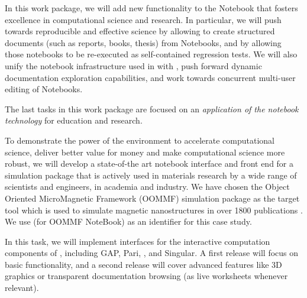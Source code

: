 \begin{workpackage}
\begin{wpdescription}

    In this work package, we will add new functionality to the \Jupyter
    Notebook that fosters excellence in computational science and
    research. In particular, we will push towards reproducible and
    effective science by allowing to create structured
    documents (such as reports, books, thesis) from Notebooks, and by
    allowing those notebooks to be re-executed as self-contained
    regression tests. We will also unify the notebook infrastructure
    used in \Sage with \Jupyter, push forward dynamic documentation
    exploration capabilities, and work towards concurrent multi-user
    editing of Notebooks.

  The last tasks in this work package are focused on an
  \emph{application of the \Jupyter notebook technology} for education
  and research.


  To demonstrate the power of the \Jupyter {} environment to
  accelerate computational science, deliver better value for money and
  make computational science more robust, we will develop a
  state-of-the art \Jupyter notebook interface and front end for a
  simulation package that is actively used in materials research by a
  wide range of scientists and engineers, in academia and industry. We
  have chosen the Object Oriented MicroMagnetic Framework (OOMMF)
  simulation package \cite{OOMMF-url} as the target tool which is used
  to simulate magnetic nanostructures in over 1800 publications
  \cite{OOMMF-citations-url}. We use \OOMMFNB{} (for OOMMF NoteBook)
  as an identifier for this case study.
\end{wpdescription}

\begin{tasklist}
\begin{task}[title=Uniform notebook interface for all interactive components,id=ipython-kernels]
  In this task, we will implement \Jupyter interfaces for the
  interactive computation components of \TheProject, including GAP,
  Pari, \Sage, and Singular. A first release
   will focus on basic functionality,
  and a second release  will cover advanced
  features like 3D graphics or transparent documentation browsing (as
  live worksheets whenever relevant).


\end{task}
\end{tasklist}
\end{workpackage}
